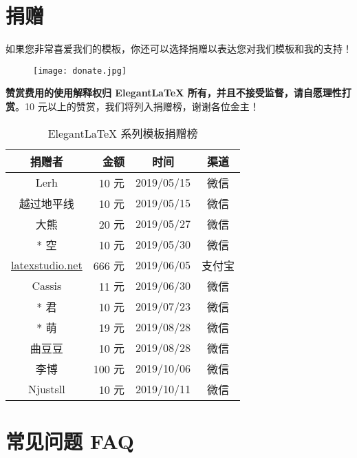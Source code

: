 \documentclass[lang=cn,11pt,a4paper]{elegantpaper}
\begin{document}
\section{捐赠}
如果您非常喜爱我们的模板，你还可以选择捐赠以表达您对我们模板和我的支持！

\begin{figure}[htbp]
  \centering
  \texttt{[image: donate.jpg]}
\end{figure}

\textbf{赞赏费用的使用解释权归 Elegant\LaTeX{} 所有，并且不接受监督，请自愿理性打赏}。10 元以上的赞赏，我们将列入捐赠榜，谢谢各位金主！

\begin{table}[!htbp]
  \centering
  \caption{Elegant\LaTeX{} 系列模板捐赠榜}
  \begin{tabular}{crcc}
    \toprule
    捐赠者   & 金额 & 时间 & 渠道 \\
    \midrule
    Lerh  & 10 元  & 2019/05/15 & 微信 \\
    越过地平线 & 10 元    & 2019/05/15 & 微信 \\
    大熊 &  20 元 & 2019/05/27 & 微信 \\
    * 空 & 10 元 & 2019/05/30 & 微信\\
    \href{http://www.latexstudio.net/}{latexstudio.net} & 666 元 & 2019/06/05 & 支付宝\\
    Cassis & 11 元 & 2019/06/30 & 微信\\
    * 君 & 10 元 & 2019/07/23 & 微信\\
    * 萌 & 19 元 & 2019/08/28 & 微信 \\
    曲豆豆 & 10 元 & 2019/08/28 & 微信 \\
    李博 & 100 元 & 2019/10/06 & 微信\\
    Njustsll & 10 元 & 2019/10/11 & 微信 \\
  \bottomrule
  \end{tabular}%
\end{table}%

\section{常见问题 FAQ}
\end{document}
